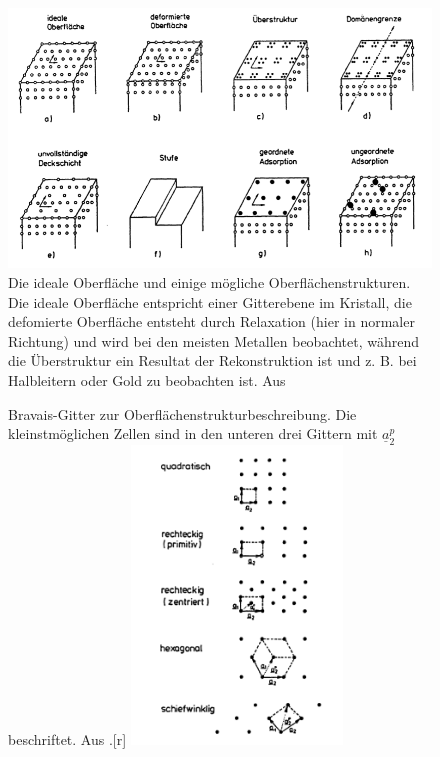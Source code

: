 \begin{figure}
    \includegraphics[width=1.0\textwidth]{pics/oberflaechenstruktur}
    \caption{Die ideale Oberfläche und einige mögliche Oberflächenstrukturen. 
Die ideale Oberfläche entspricht einer Gitterebene im Kristall, die defomierte 
Oberfläche entsteht durch Relaxation (hier in normaler Richtung) und wird bei den 
meisten Metallen beobachtet, während die Überstruktur ein Resultat der Rekonstruktion 
ist und z. B. bei Halbleitern oder Gold zu beobachten ist. 
Aus \cite{henzler1991oberflachenphysik} }
    \label{fig:oberflaeche}
\end{figure} 
\begin{figure}
  \begin{captionbeside}{Bravais-Gitter zur Oberflächenstrukturbeschreibung. Die 
kleinstmöglichen Zellen sind in den unteren drei Gittern mit $\underline{a}_2^p$ 
beschriftet. 
Aus \cite{henzler1991oberflachenphysik}.}[r]
    \includegraphics[width=0.5\textwidth]{pics/Bravais}
  \end{captionbeside}
  \label{fig:Bravais}
\end{figure} 


